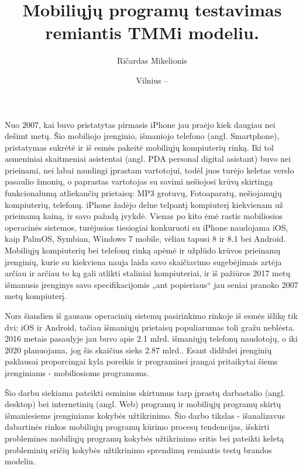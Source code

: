 \documentclass{VUMIFPSkursinis}
\title{Mobiliųjų programų testavimas remiantis TMMi modeliu.}
\author{Ričardas Mikelionis}
\date{Vilnius – \the\year}
\begin{document}
\maketitle

\cleardoublepage
{}
\tableofcontents
\cleardoublepage
{}

Nuo 2007, kai buvo pristatytas pirmasis iPhone jau praėjo kiek daugiau nei dešimt metų. Šio mobiliojo įrenginio, išmaniojo telefono (angl. Smartphone), pristatymas sukrėtė ir iš esmės pakeitė mobiliųjų kompiuterių rinką. Iki tol asmeniniai skaitmeniai asistentai (angl. PDA personal digital asistant) buvo nei prieinami, nei labai naudingi įprastam vartotojui, todėl juos turėjo keletas verslo pasaulio žmonių, o paprastas vartotojas su savimi nešiojosi krūvą skirtingą funkcionalumą atliekančių prietaisų: MP3 grotuvų, Fotoaparatų, nešiojamųjų kompiuterių, telefonų. iPhone žadėjo delne telpantį kompiuterį kiekvienam už prieinamą kainą, ir savo pažadą įvykdė. Vienas po kito ėmė rastis  mobiliosios operacinės sistemos, turėjusios tiesiogiai konkuruoti su iPhone naudojama iOS,  kaip PalmOS, Symbian, Windows 7 mobile, vėliau tapusi 8 ir 8.1 bei Android. Mobiliųjų kompiuterių bei telefonų rinką apėmė ir užplūdo krūvos prieinamų įrenginių, kurie su kiekviena nauja laida savo skaičiavimo sugebėjimais artėja arčiau ir arčiau to ką gali atlikti staliniai kompiuteriai, ir iš pažiūros 2017 metų išmanusis įrenginys savo specifikacijomis „ant popieriaus“ jau seniai pranoko 2007 metų kompiuterį.

Nors šiandien iš gausaus operacinių sistemų pasirinkimo rinkoje iš esmės išlikę tik dvi: iOS ir Android, tačiau  išmaniųjų prietaisų populiarumas toli gražu neblėsta. 2016 metais pasaulyje jau buvo apie 2.1 mlrd. išmaniųjų telefonų naudotojų, o iki 2020 planuojama, jog šis skaičius sieks 2.87 mlrd.\cite {statista.com}. Esant didžulei įrenginių paklausai proporcingai kyla poreikis ir programinei įrangai pritaikytai šiems įrenginiams - mobiliosioms programoms.

Šio darbu siekiama pateikti esminius skirtumus tarp įprastų darbastalio (angl. desktop) bei internetinių (angl. Web) programų ir mobiliųjų programų skirtų išmaniesiems įrenginiams kokybės užtikrinimo. Šio darbo tikslas - išanalizavus dabartinės rinkos mobiliųjų programų kūrimo procesų tendencijas, išskirti problemines mobiliųjų programų kokybės užtikrinimo sritis bei pateikti keletą probleminių sričių kokybės užtikrinimo sprendimų remiantis testų brandos modeliu.
\end{document}
